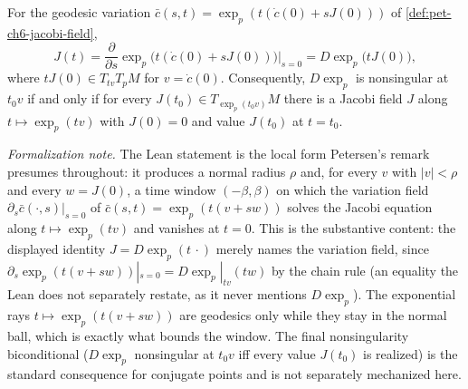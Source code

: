 \begin{remark}
  \label{rem:pet-ch6-jacobi-dexp-relation}


  For the geodesic variation $\bar c(s,t)=\exp_p(t(\dot c(0)+sJ(0)))$ of
  \cref{def:pet-ch6-jacobi-field},
  \[
    J(t)=\frac{\partial}{\partial s}\exp_p\big(t(\dot c(0)+sJ(0))\big)\Big|_{s=0}
    =D\exp_p\big(tJ(0)\big),
  \]
  where $tJ(0)\in T_{tv}T_pM$ for $v=\dot c(0)$. Consequently, $D\exp_p$ is
  nonsingular at $t_0v$ if and only if for every $J(t_0)\in
  T_{\exp_p(t_0v)}M$ there is a Jacobi field $J$ along $t\mapsto\exp_p(tv)$
  with $J(0)=0$ and value $J(t_0)$ at $t=t_0$.

  \emph{Formalization note.} The Lean statement is the local form Petersen's
  remark presumes throughout: it produces a normal radius $\rho$ and, for every
  $v$ with $\lvert v\rvert<\rho$ and every $w=J(0)$, a time window $(-\beta,\beta)$
  on which the variation field $\partial_s\bar c(\cdot,s)|_{s=0}$ of
  $\bar c(s,t)=\exp_p(t(v+sw))$ solves the Jacobi equation along
  $t\mapsto\exp_p(tv)$ and vanishes at $t=0$. This is the substantive content: the
  displayed identity $J=D\exp_p(t\,\cdot)$ merely names the variation field, since
  $\partial_s\exp_p(t(v+sw))|_{s=0}=D\exp_p|_{tv}(tw)$ by the chain rule (an
  equality the Lean does not separately restate, as it never mentions $D\exp_p$).
  The exponential rays $t\mapsto\exp_p(t(v+sw))$ are geodesics only while they stay
  in the normal ball, which is exactly what bounds the window. The final
  nonsingularity biconditional ($D\exp_p$ nonsingular at $t_0v$ iff every value
  $J(t_0)$ is realized) is the standard consequence for conjugate points and is not
  separately mechanized here.
\end{remark}

